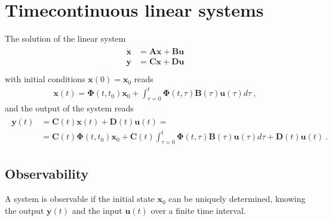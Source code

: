 \documentclass[letterpaper,10pt,english]{jupyterBook}
\begin{document}
\section{Time\sphinxhyphen{}continuous linear systems}
\label{\detokenize{ch/system-theory/observability-detectability:time-continuous-linear-systems}}\label{\detokenize{ch/system-theory/observability-detectability:observability-detectability-time-continuous}}
\sphinxAtStartPar
The solution of the linear system
\begin{equation*}
\begin{split}\begin{aligned}
  \dot{\mathbf{x}} & = \mathbf{A} \mathbf{x} + \mathbf{B} \mathbf{u} \\
       \mathbf{y}  & = \mathbf{C} \mathbf{x} + \mathbf{D} \mathbf{u} \\
\end{aligned}\end{split}
\end{equation*}
\sphinxAtStartPar
with initial conditions \(\mathbf{x}(0) = \mathbf{x}_0\) reads
\begin{equation*}
\begin{split}\mathbf{x}(t) = \boldsymbol\Phi(t,t_0) \mathbf{x}_0 + \int_{\tau=0}^{t} \boldsymbol\Phi(t,\tau) \mathbf{B}(\tau) \mathbf{u}(\tau) d \tau \ ,\end{split}
\end{equation*}
\sphinxAtStartPar
and the output of the system reads
\begin{equation}\label{equation:ch/system-theory/observability-detectability:eq:linear:output}
\begin{split}\begin{aligned}
  \mathbf{y}(t)
  & = \mathbf{C}(t) \mathbf{x}(t) + \mathbf{D}(t) \mathbf{u}(t) = \\
  & = \mathbf{C}(t) \boldsymbol\Phi(t,t_0) \mathbf{x}_0 + \mathbf{C}(t) \int_{\tau=0}^{t} \boldsymbol\Phi(t,\tau) \mathbf{B}(\tau) \mathbf{u}(\tau) d \tau  + \mathbf{D}(t) \mathbf{u}(t)  \ .
\end{aligned}\end{split}
\end{equation}

\subsection{Observability}
\label{\detokenize{ch/system-theory/observability-detectability:observability}}
\sphinxAtStartPar
A system is observable if the initial state \(\mathbf{x}_0\) can be uniquely determined, knowing the output \(\mathbf{y}(t)\) and the input \(\mathbf{u}(t)\) over a finite time interval.
\end{document}
